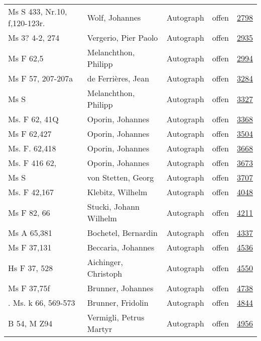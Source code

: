 \documentclass[10pt,a4paper,landscape]{report}
\begin{document}
\begin{longtable}{p{16cm}p{4cm}llr}
Ms S 433, Nr.10, f,120-123r.	&	Wolf, Johannes	&	Autograph	&	offen	&	\href{http://130.60.24.72/assignment/2798}{2798}\\
Ms 3? 4-2, 274	&	Vergerio, Pier Paolo	&	Autograph	&	offen	&	\href{http://130.60.24.72/assignment/2935}{2935}\\
Ms F 62,5	&	Melanchthon, Philipp	&	Autograph	&	offen	&	\href{http://130.60.24.72/assignment/2994}{2994}\\
Ms F 57, 207-207a	&	de Ferrières, Jean	&	Autograph	&	offen	&	\href{http://130.60.24.72/assignment/3284}{3284}\\
Ms S	&	Melanchthon, Philipp	&	Autograph	&	offen	&	\href{http://130.60.24.72/assignment/3327}{3327}\\
Ms. F 62, 41Q	&	Oporin, Johannes	&	Autograph	&	offen	&	\href{http://130.60.24.72/assignment/3368}{3368}\\
Ms F 62,427	&	Oporin, Johannes	&	Autograph	&	offen	&	\href{http://130.60.24.72/assignment/3504}{3504}\\
Ms. F. 62,418	&	Oporin, Johannes	&	Autograph	&	offen	&	\href{http://130.60.24.72/assignment/3668}{3668}\\
Ms. F 416 62,	&	Oporin, Johannes	&	Autograph	&	offen	&	\href{http://130.60.24.72/assignment/3673}{3673}\\
Ms S	&	von Stetten, Georg	&	Autograph	&	offen	&	\href{http://130.60.24.72/assignment/3707}{3707}\\
Ms. F 42,167	&	Klebitz, Wilhelm	&	Autograph	&	offen	&	\href{http://130.60.24.72/assignment/4048}{4048}\\
Ms F 82, 66	&	Stucki, Johann Wilhelm	&	Autograph	&	offen	&	\href{http://130.60.24.72/assignment/4211}{4211}\\
Ms A 65,381	&	Bochetel, Bernardin	&	Autograph	&	offen	&	\href{http://130.60.24.72/assignment/4337}{4337}\\
Ms F 37,131	&	Beccaria, Johannes	&	Autograph	&	offen	&	\href{http://130.60.24.72/assignment/4536}{4536}\\
Hs F 37, 528	&	Aichinger, Christoph	&	Autograph	&	offen	&	\href{http://130.60.24.72/assignment/4550}{4550}\\
Ms F 37,75f	&	Brunner, Johannes	&	Autograph	&	offen	&	\href{http://130.60.24.72/assignment/4738}{4738}\\
. Ms. k 66, 569-573	&	Brunner, Fridolin	&	Autograph	&	offen	&	\href{http://130.60.24.72/assignment/4844}{4844}\\
B 54, M Z94	&	Vermigli, Petrus Martyr	&	Autograph	&	offen	&	\href{http://130.60.24.72/assignment/4956}{4956}\\

\end{longtable}
\end{document}
